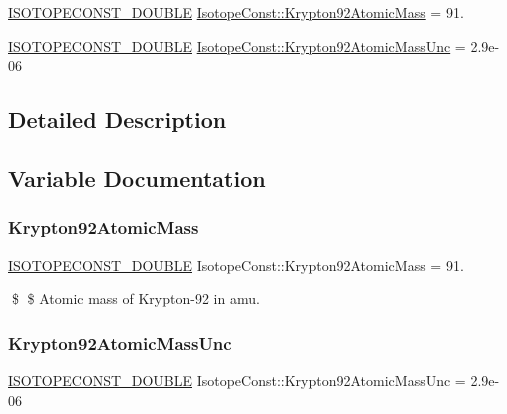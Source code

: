 \begin{DoxyCompactItemize}
\item 
\mbox{\hyperlink{group___isotope_const-_macros_ga8f45a7272ce02c0b4c65c44636ed719a}{I\+S\+O\+T\+O\+P\+E\+C\+O\+N\+S\+T\+\_\+\+D\+O\+U\+B\+LE}} \mbox{\hyperlink{group___isotope_const-_krypton-_kr92_ga3dbe095118e0c7680e148f7537c8a128}{Isotope\+Const\+::\+Krypton92\+Atomic\+Mass}} = 91.
\item 
\mbox{\hyperlink{group___isotope_const-_macros_ga8f45a7272ce02c0b4c65c44636ed719a}{I\+S\+O\+T\+O\+P\+E\+C\+O\+N\+S\+T\+\_\+\+D\+O\+U\+B\+LE}} \mbox{\hyperlink{group___isotope_const-_krypton-_kr92_ga79c3f6da99788f8f0fdb274cddfcd177}{Isotope\+Const\+::\+Krypton92\+Atomic\+Mass\+Unc}} = 2.\+9e-\/06
\end{DoxyCompactItemize}


\subsection{Detailed Description}


\subsection{Variable Documentation}
\mbox{\label{group___isotope_const-_krypton-_kr92_ga3dbe095118e0c7680e148f7537c8a128}} 
\subsubsection{\texorpdfstring{Krypton92\+Atomic\+Mass}{Krypton92AtomicMass}}
{\footnotesize\ttfamily \mbox{\hyperlink{group___isotope_const-_macros_ga8f45a7272ce02c0b4c65c44636ed719a}{I\+S\+O\+T\+O\+P\+E\+C\+O\+N\+S\+T\+\_\+\+D\+O\+U\+B\+LE}} Isotope\+Const\+::\+Krypton92\+Atomic\+Mass = 91.}

\$ \$ Atomic mass of Krypton-\/92 in amu. \mbox{\label{group___isotope_const-_krypton-_kr92_ga79c3f6da99788f8f0fdb274cddfcd177}} 
\subsubsection{\texorpdfstring{Krypton92\+Atomic\+Mass\+Unc}{Krypton92AtomicMassUnc}}
{\footnotesize\ttfamily \mbox{\hyperlink{group___isotope_const-_macros_ga8f45a7272ce02c0b4c65c44636ed719a}{I\+S\+O\+T\+O\+P\+E\+C\+O\+N\+S\+T\+\_\+\+D\+O\+U\+B\+LE}} Isotope\+Const\+::\+Krypton92\+Atomic\+Mass\+Unc = 2.\+9e-\/06}

